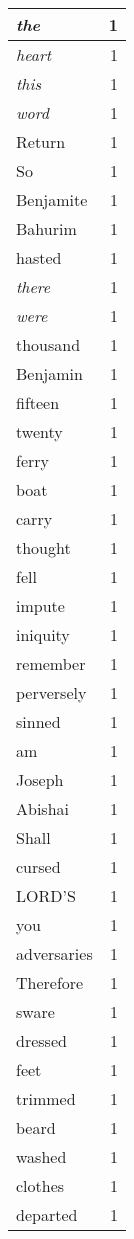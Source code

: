 \begin{center}
\begin{longtable}{l|r}
\emph{the} & 1 \\ \hline
\emph{heart} & 1 \\ \hline
\emph{this} & 1 \\ \hline
\emph{word} & 1 \\ \hline
Return & 1 \\ \hline
So & 1 \\ \hline
Benjamite & 1 \\ \hline
Bahurim & 1 \\ \hline
hasted & 1 \\ \hline
\emph{there} & 1 \\ \hline
\emph{were} & 1 \\ \hline
thousand & 1 \\ \hline
Benjamin & 1 \\ \hline
fifteen & 1 \\ \hline
twenty & 1 \\ \hline
ferry & 1 \\ \hline
boat & 1 \\ \hline
carry & 1 \\ \hline
thought & 1 \\ \hline
fell & 1 \\ \hline
impute & 1 \\ \hline
iniquity & 1 \\ \hline
remember & 1 \\ \hline
perversely & 1 \\ \hline
sinned & 1 \\ \hline
am & 1 \\ \hline
Joseph & 1 \\ \hline
Abishai & 1 \\ \hline
Shall & 1 \\ \hline
cursed & 1 \\ \hline
LORD'S & 1 \\ \hline
you & 1 \\ \hline
adversaries & 1 \\ \hline
Therefore & 1 \\ \hline
sware & 1 \\ \hline
dressed & 1 \\ \hline
feet & 1 \\ \hline
trimmed & 1 \\ \hline
beard & 1 \\ \hline
washed & 1 \\ \hline
clothes & 1 \\ \hline
departed & 1 \\ \hline

\end{longtable}
\end{center}
